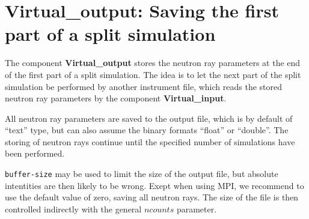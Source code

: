 \section{Virtual\_output: Saving the first part of a split simulation}
\label{virtual_output}


The component {\bf Virtual\_output} stores the neutron ray parameters
at the end of the first part of a split simulation. The idea is to let the
next part of the split simulation be performed by another instrument file,
which reads the stored neutron ray
parameters by the component {\bf Virtual\_input}.

All neutron ray parameters are saved to the output file, which is by default
of ``text'' type, but can also assume the binary formats
``float'' or ``double''. The storing of neutron rays continue until the
specified number of simulations have been performed.

\verb+buffer-size+ may be used to limit the size of the output file, but
absolute intentities are then likely to be wrong.
Exept when using MPI, we recommend to use the default value of zero, saving all neutron rays.
The size of the file is then controlled indirectly with the general $ncounts$ parameter.
